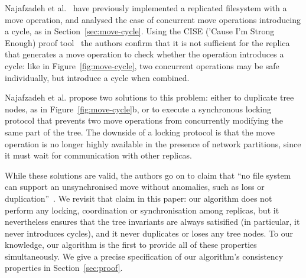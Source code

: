 \documentclass[sigconf]{acmart}
\begin{document}
Najafzadeh et al.~\cite{Najafzadeh:2017vk,Najafzadeh:2018bw} have previously implemented a replicated filesystem with a move operation, and analysed the case of concurrent move operations introducing a cycle, as in Section~\ref{sec:move-cycle}.
Using the CISE ('Cause I'm Strong Enough) proof tool~\cite{DBLP:conf/popl/GotsmanYFNS16,Najafzadeh:2016fi} the authors confirm that it is not sufficient for the replica that generates a move operation to check whether the operation introduces a cycle: like in Figure~\ref{fig:move-cycle}, two concurrent operations may be safe individually, but introduce a cycle when combined.

Najafzadeh et al. propose two solutions to this problem: either to duplicate tree nodes, as in Figure~\ref{fig:move-cycle}b, or to execute a synchronous locking protocol that prevents two move operations from concurrently modifying the same part of the tree.
The downside of a locking protocol is that the move operation is no longer highly available in the presence of network partitions, since it must wait for communication with other replicas.

While these solutions are valid, the authors go on to claim that ``no file system can support an unsynchronised move without anomalies, such as loss or duplication''~\cite{Najafzadeh:2018bw}.
We revisit that claim in this paper: our algorithm does not perform any locking, coordination or synchronisation among replicas, but it nevertheless ensures that the tree invariants are always satisified (in particular, it never introduces cycles), and it never duplicates or loses any tree nodes.
To our knowledge, our algorithm is the first to provide all of these properties simultaneously.
We give a precise specification of our algorithm's consistency properties in Section~\ref{sec:proof}.
\end{document}
